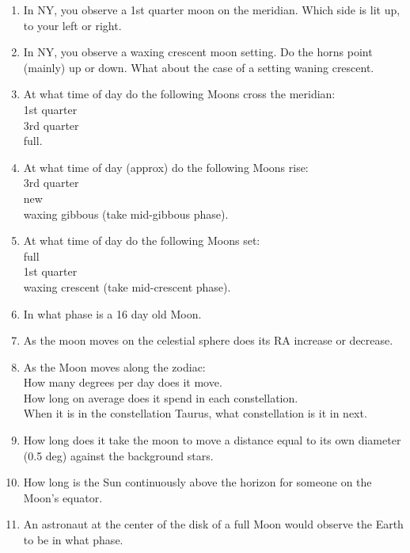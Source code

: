 \documentclass[11pt]{article}
\begin{document}
\begin{enumerate} 

\item 
In NY, you observe a 1st quarter moon on the meridian. Which
side is lit up, to your left or right.

\item 
In NY, you observe a waxing crescent moon setting. Do the horns point
(mainly) up or down. What about the case of a setting waning crescent.

\item 
At what time of day do the following Moons cross the meridian:\\
1st quarter \\
3rd quarter \\
full.

\item 
At what time of day (approx) do the following Moons rise: \\
3rd quarter \\
new \\
waxing gibbous (take mid-gibbous phase).

\item
At what time of day do the following Moons set: \\
full \\
1st quarter \\
waxing crescent (take mid-crescent phase).

\item In what phase is a 16 day old Moon.


\item
As the moon moves on the celestial sphere does its RA increase or decrease.


\item
As the Moon moves along the zodiac:\\
How many degrees per day does it move. \\
How long on average does it spend in each constellation. \\
When it is in the constellation Taurus, what constellation is it in next.

\item
How long does it take the moon to move a distance equal to its own
diameter (0.5 deg) against the background stars.

\item
How long is the Sun continuously above the horizon for someone on the
Moon's equator.

\item An astronaut at the center of the disk of a full Moon would
observe the Earth to be in what phase.


\end{enumerate}
\end{document}
